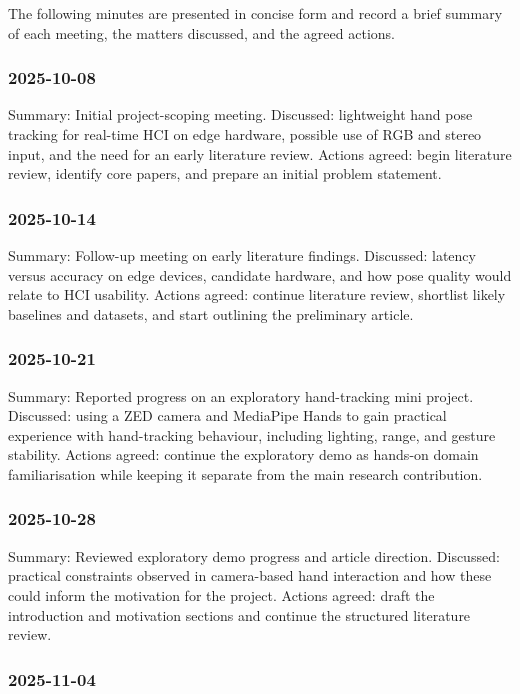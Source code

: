 ﻿\documentclass[11pt,a4paper]{article}
\begin{document}
The following minutes are presented in concise form and record a brief summary
of each meeting, the matters discussed, and the agreed actions.

\subsubsection*{2025-10-08}

Summary: Initial project-scoping meeting.
Discussed: lightweight hand pose tracking for real-time HCI on edge hardware,
possible use of RGB and stereo input, and the need for an early literature
review.
Actions agreed: begin literature review, identify core papers, and prepare an
initial problem statement.

\subsubsection*{2025-10-14}

Summary: Follow-up meeting on early literature findings.
Discussed: latency versus accuracy on edge devices, candidate hardware, and how
pose quality would relate to HCI usability.
Actions agreed: continue literature review, shortlist likely baselines and
datasets, and start outlining the preliminary article.

\subsubsection*{2025-10-21}

Summary: Reported progress on an exploratory hand-tracking mini project.
Discussed: using a ZED camera and MediaPipe Hands to gain practical experience
with hand-tracking behaviour, including lighting, range, and gesture stability.
Actions agreed: continue the exploratory demo as hands-on domain familiarisation
while keeping it separate from the main research contribution.

\subsubsection*{2025-10-28}

Summary: Reviewed exploratory demo progress and article direction.
Discussed: practical constraints observed in camera-based hand interaction and
how these could inform the motivation for the project.
Actions agreed: draft the introduction and motivation sections and continue the
structured literature review.

\subsubsection*{2025-11-04}
\end{document}
